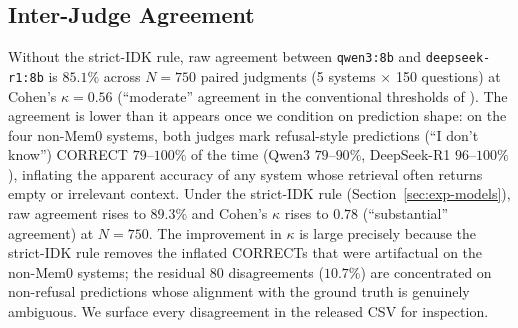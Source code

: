 \subsection{Inter-Judge Agreement}
\label{sec:exp-agreement}

Without the strict-IDK rule, raw agreement between \texttt{qwen3:8b} and \texttt{deepseek-r1:8b} is $85.1\%$ across $N = 750$ paired judgments (5 systems $\times$ 150 questions) at Cohen's $\kappa = 0.56$ (``moderate'' agreement in the conventional thresholds of \citet{landis1977kappa}). The agreement is lower than it appears once we condition on prediction shape: on the four non-Mem0 systems, both judges mark refusal-style predictions (``I don't know'') CORRECT $79$--$100\%$ of the time (Qwen3 $79$--$90\%$, DeepSeek-R1 $96$--$100\%$), inflating the apparent accuracy of any system whose retrieval often returns empty or irrelevant context. Under the strict-IDK rule (Section~\ref{sec:exp-models}), raw agreement rises to $89.3\%$ and Cohen's $\kappa$ rises to $0.78$ (``substantial'' agreement) at $N = 750$. The improvement in $\kappa$ is large precisely because the strict-IDK rule removes the inflated CORRECTs that were artifactual on the non-Mem0 systems; the residual $80$ disagreements ($10.7\%$) are concentrated on non-refusal predictions whose alignment with the ground truth is genuinely ambiguous. We surface every disagreement in the released CSV for inspection.
